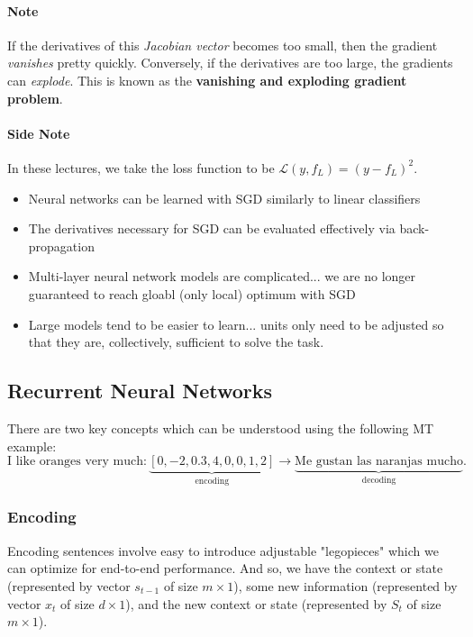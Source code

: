 \documentclass{article}
\begin{document}
\paragraph{Note} If the derivatives of this \emph{Jacobian vector} becomes too small, then the gradient \emph{vanishes} pretty quickly. Conversely, if the derivatives are too large, the gradients can \emph{explode}. This is known as the \textbf{vanishing and exploding gradient problem}.

\paragraph{Side Note} In these lectures, we take the loss function to be $\mathcal{L}(y,f_L)=(y-f_L)^2$.

\begin{itemize}
	\item Neural networks can be learned with SGD similarly to linear classifiers
	\item The derivatives necessary for SGD can be evaluated effectively via back-propagation
	\item Multi-layer neural network models are complicated... we are no longer guaranteed to reach gloabl (only local) optimum with SGD
	\item Large models tend to be easier to learn... units only need to be adjusted so that they are, collectively, sufficient to solve the task.
\end{itemize}

\subsection{Recurrent Neural Networks}
There are two key concepts which can be understood using the following MT example:
\[\text{I like oranges very much}:\underbrace{[0,-2,0.3,4,0,0,1,2]}_\text{encoding}\rightarrow\underbrace{\text{Me gustan las naranjas mucho}}_{\text{decoding}}.\]

\subsubsection{Encoding}

Encoding sentences involve easy to introduce adjustable "legopieces" which we can optimize for end-to-end performance. And so, we have the context or state (represented by vector $s_{t-1}$ of size $m\times 1$), some new information (represented by vector $x_t$ of size $d\times 1$), and the new context or state (represented by $S_t$ of size $m\times 1$).
\end{document}
